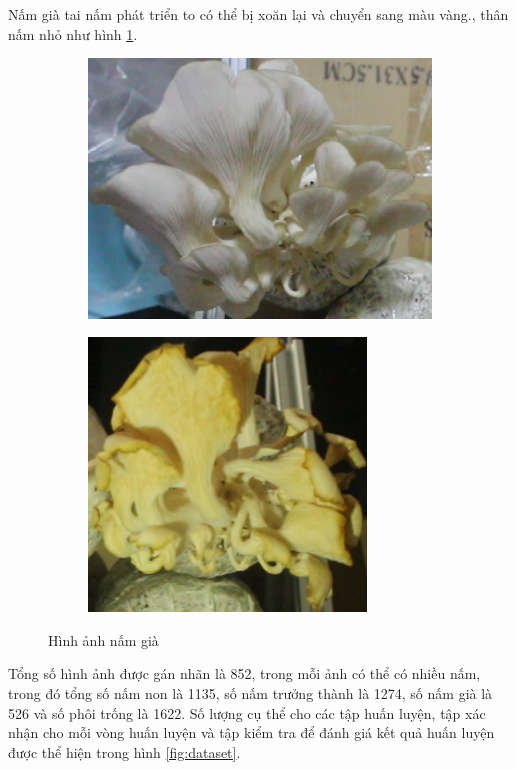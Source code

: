 Nấm già tai nấm phát triển to có thể bị xoăn lại và chuyển sang màu vàng., thân nấm nhỏ như hình \ref{fig:old}.
\begin{figure}[H]
    \centering
    \begin{subfigure}{.5\textwidth}
        \includegraphics[width=0.85\linewidth]{images/old1.png}
    \end{subfigure}%
    \begin{subfigure}{.5\textwidth}
        \includegraphics[width=0.85\linewidth]{images/old3.png}
    \end{subfigure}
    \caption{Hình ảnh nấm già}
    \label{fig:old}
\end{figure}

Tổng số hình ảnh được gán nhãn là 852, trong mỗi ảnh có thể có nhiều nấm, trong đó tổng số nấm non là 1135, số nấm trưởng thành là 1274, số nấm già là 526 và số phôi trống là 1622\cite{agrivision_mushroom_dataset}. Số lượng cụ thể cho các tập huấn luyện, tập xác nhận cho mỗi vòng huấn luyện và tập kiểm tra để đánh giá kết quả huấn luyện được thể hiện trong hình \ref{fig:dataset}.

